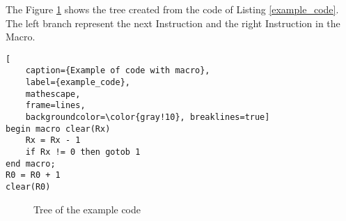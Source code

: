 The Figure \ref{tree} shows the tree created from the code of Listing \ref{example_code}. The left branch represent the next Instruction and the right Instruction in the Macro.

\newpage
\begin{lstlisting}[
    caption={Example of code with macro}, 
    label={example_code},
    mathescape, 
    frame=lines,
    backgroundcolor=\color{gray!10}, breaklines=true]
begin macro clear(Rx)
    Rx = Rx - 1
    if Rx != 0 then gotob 1
end macro;
R0 = R0 + 1
clear(R0)
\end{lstlisting}


\begin{figure}[H]
    \centering
    \caption{Tree of the example code}
    \label{tree}
\end{figure}







